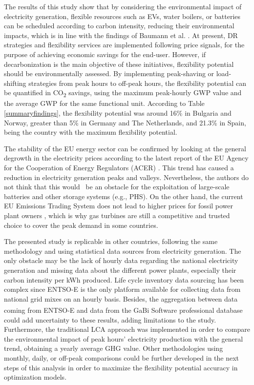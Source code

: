 {{{{{The results of this study show that by considering the environmental impact of electricity generation, flexible resources such as EVs, water boilers, or batteries can be scheduled according to carbon intensity, reducing their environmental impacts, which is in line with the findings of Baumann et al. \cite{Baumann2019}}. {At present, DR strategies and flexibility services are implemented following price signals, for the purpose of achieving economic savings for the end-user. However, if decarbonization is the main objective of these initiatives, flexibility potential should be environmentally assessed. By implementing peak-shaving or load-shifting strategies from peak hours to off-peak hours, the flexibility potential can be quantified in CO\textsubscript{2} savings, using the maximum peak-hourly GWP value and the average GWP for the same functional unit. According to Table \ref{summaryfindings}, the flexibility potential was around 16\% in Bulgaria and Norway, greater than 5\% in Germany and The Netherlands, and 21.3\% in Spain, being the country with the maximum flexibility potential.} 

{The stability of the EU energy sector can be confirmed by looking at the general degrowth in the electricity prices according to the latest report of the EU Agency for the Cooperation of Energy Regulators (ACER) \cite{ACER2018}. This trend has caused a reduction in electricity generation peaks and valleys. Nevertheless, the authors do not think that this would%
~be an obstacle for the exploitation of large-scale batteries and other storage systems (e.g., PHS). On the other hand, the current EU Emissions Trading System does not lead to higher prices for fossil power plant owners \cite{DEANE20101293}, which is why gas turbines are still a competitive and trusted choice to cover the peak demand in some countries}.

{The presented study is replicable in other countries, following the same methodology and using statistical data sources from electricity generation. The only obstacle may be the lack of hourly data regarding the national electricity generation and  missing data about the different power plants, especially their carbon intensity per kWh produced.} {Life cycle inventory data sourcing has been complex since ENTSO-E is the only platform available for collecting data from national grid mixes on an hourly basis. Besides, the aggregation between data coming from ENTSO-E and data from the GaBi\textsuperscript{\textregistered} Software professional database could add  uncertainty to these results, adding limitations to the study. Furthermore, the traditional LCA approach was implemented in order to compare the environmental impact of peak hours' electricity production with the general trend,  obtaining a yearly average GHG value. Other methodologies using monthly, daily, or off-peak comparisons could be further developed in the next steps of this analysis in order to maximize the flexibility potential accuracy in optimization models.}

}}}}
